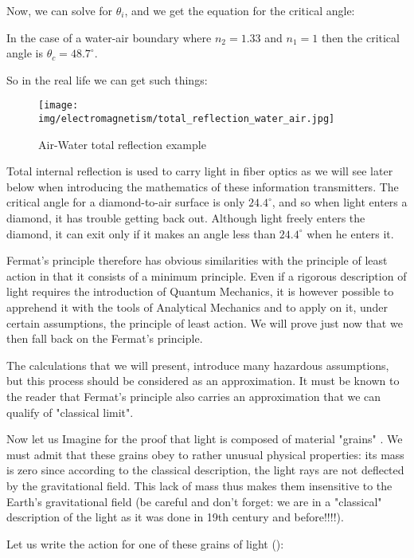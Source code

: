 	Now, we can solve for $\theta_i$, and we get the equation for the critical angle:
	
	In the case of a water-air boundary where $n_2 = 1.33$ and $n_1=1$ then the critical angle is $\theta_c = 48.7^\circ$.
	
	So in the real life we can get such things:
	\begin{figure}[H]
		\centering
		\texttt{[image: img/electromagnetism/total\_reflection\_water\_air.jpg]}
		\caption[]{Air-Water total reflection example}
	\end{figure}
	\begin{tcolorbox}[title=Remark,colframe=black,arc=10pt]
	Total internal reflection is used to carry light in fiber optics as we will see later below when introducing the mathematics of these information transmitters. The critical angle for a diamond-to-air surface is only $24.4^\circ$, and so when light enters a diamond, it has trouble getting back out. Although light freely enters the diamond, it can exit only if it makes an angle less than $24.4^\circ$ when he enters it.
	\end{tcolorbox}
	Fermat's principle therefore has obvious similarities with the principle of least action in that it consists of a minimum principle. Even if a rigorous description of light requires the introduction of Quantum Mechanics, it is however possible to apprehend it with the tools of Analytical Mechanics and to apply on it, under certain assumptions, the principle of least action. We will prove just now that we then fall back on the Fermat's principle.

	The calculations that we will present, introduce many hazardous assumptions, but this process should be considered as an approximation. It must be known to the reader that Fermat's principle also carries an approximation that we can qualify of "classical limit".
	
	Now let us Imagine for the proof that light is composed of material "grains" . We must admit that these grains obey to rather unusual physical properties: its mass is zero since according to the classical description, the light rays are not deflected by the gravitational field. This lack of mass thus makes them insensitive to the Earth's gravitational field (be careful and don't forget: we are in a "classical" description of the light as it was done in 19th century and before!!!!).

	Let us write the action for one of these grains of light ():
	
